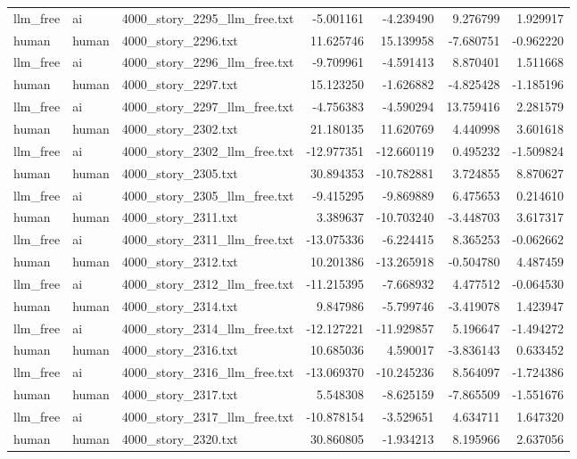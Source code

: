 \begin{longtable}{lllrrrr}
llm\_free & ai & 4000\_story\_2295\_llm\_free.txt & -5.001161 & -4.239490 & 9.276799 & 1.929917 \\
human & human & 4000\_story\_2296.txt & 11.625746 & 15.139958 & -7.680751 & -0.962220 \\
llm\_free & ai & 4000\_story\_2296\_llm\_free.txt & -9.709961 & -4.591413 & 8.870401 & 1.511668 \\
human & human & 4000\_story\_2297.txt & 15.123250 & -1.626882 & -4.825428 & -1.185196 \\
llm\_free & ai & 4000\_story\_2297\_llm\_free.txt & -4.756383 & -4.590294 & 13.759416 & 2.281579 \\
human & human & 4000\_story\_2302.txt & 21.180135 & 11.620769 & 4.440998 & 3.601618 \\
llm\_free & ai & 4000\_story\_2302\_llm\_free.txt & -12.977351 & -12.660119 & 0.495232 & -1.509824 \\
human & human & 4000\_story\_2305.txt & 30.894353 & -10.782881 & 3.724855 & 8.870627 \\
llm\_free & ai & 4000\_story\_2305\_llm\_free.txt & -9.415295 & -9.869889 & 6.475653 & 0.214610 \\
human & human & 4000\_story\_2311.txt & 3.389637 & -10.703240 & -3.448703 & 3.617317 \\
llm\_free & ai & 4000\_story\_2311\_llm\_free.txt & -13.075336 & -6.224415 & 8.365253 & -0.062662 \\
human & human & 4000\_story\_2312.txt & 10.201386 & -13.265918 & -0.504780 & 4.487459 \\
llm\_free & ai & 4000\_story\_2312\_llm\_free.txt & -11.215395 & -7.668932 & 4.477512 & -0.064530 \\
human & human & 4000\_story\_2314.txt & 9.847986 & -5.799746 & -3.419078 & 1.423947 \\
llm\_free & ai & 4000\_story\_2314\_llm\_free.txt & -12.127221 & -11.929857 & 5.196647 & -1.494272 \\
human & human & 4000\_story\_2316.txt & 10.685036 & 4.590017 & -3.836143 & 0.633452 \\
llm\_free & ai & 4000\_story\_2316\_llm\_free.txt & -13.069370 & -10.245236 & 8.564097 & -1.724386 \\
human & human & 4000\_story\_2317.txt & 5.548308 & -8.625159 & -7.865509 & -1.551676 \\
llm\_free & ai & 4000\_story\_2317\_llm\_free.txt & -10.878154 & -3.529651 & 4.634711 & 1.647320 \\
human & human & 4000\_story\_2320.txt & 30.860805 & -1.934213 & 8.195966 & 2.637056 \\

\end{longtable}
